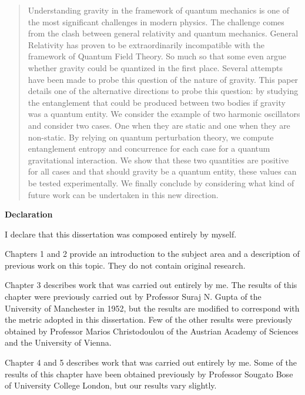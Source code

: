 \documentclass[12pt,a4paper]{report}
\theoremstyle{plain}
\theoremstyle{definition}
\theoremstyle{remark}
\begin{document}
\begin{abstract}
Understanding gravity in the framework of quantum mechanics is one of the most significant challenges in modern physics. The challenge comes from the clash between general relativity and quantum mechanics. General Relativity has proven to be extraordinarily incompatible with the framework of Quantum Field Theory. So much so that some even argue whether gravity could be quantized in the first place. Several attempts have been made to probe this question of the nature of gravity. This paper details one of the alternative directions to probe this question: by studying the entanglement that could be produced between two bodies if gravity was a quantum entity. We consider the example of two harmonic oscillators and consider two cases. One when they are static and one when they are non-static. By relying on quantum perturbation theory, we compute entanglement entropy and concurrence for each case for a quantum gravitational interaction. We show that these two quantities are positive for all cases and that should gravity be a quantum entity, these values can be tested experimentally. We finally conclude by considering what kind of future work can be undertaken in this new direction.
\end{abstract}


\begin{center}
\textbf{Declaration}
\end{center}

I declare that this dissertation was composed entirely by myself.

Chapters 1 and 2 provide an introduction to the subject area and a
description of previous work on this topic. They do not contain
original research.

Chapter 3 describes work that was carried out entirely by me. The results of this chapter were previously carried out by Professor Suraj N. Gupta of the University of Manchester in 1952, but the results are modified to correspond with the metric adopted in this dissertation. Few of the other results were previously obtained by Professor Marios Christodoulou of the Austrian Academy of Sciences and the University of Vienna. 

Chapter 4 and 5 describes work that was carried out entirely by me. Some of the results of this chapter have been obtained previously by Professor Sougato Bose of University College London, but our results vary slightly.
\end{document}
